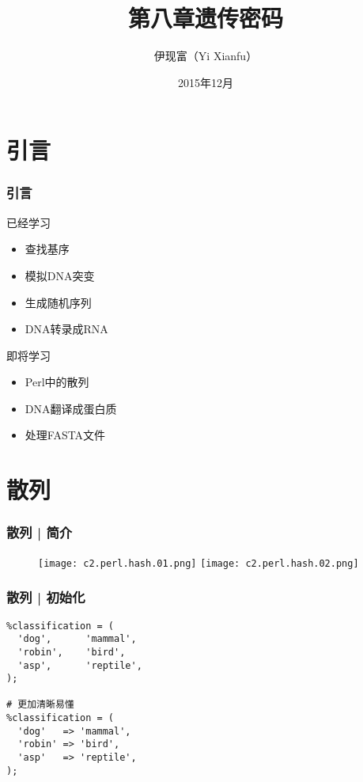 


\title[遗传密码]{第八章\quad 遗传密码}
\author[Yixf]{伊现富（Yi Xianfu）}
\date{2015年12月}



\section{引言}
\begin{frame}
  \frametitle{引言}
  \begin{block}{已经学习}
    \begin{itemize}
      \item 查找基序
      \item 模拟DNA突变
      \item 生成随机序列
      \item DNA转录成RNA
    \end{itemize}
  \end{block}
  \pause
  \begin{block}{即将学习}
    \begin{itemize}
      \item Perl中的散列
      \item DNA翻译成蛋白质
      \item 处理FASTA文件
    \end{itemize}
  \end{block}
\end{frame}

\section{散列}
\begin{frame}
  \frametitle{散列 | 简介}
  \begin{figure}
  \centering
  \texttt{[image: c2.perl.hash.01.png]}\qquad
  \texttt{[image: c2.perl.hash.02.png]}
  \end{figure}
\end{frame}

\begin{frame}[fragile]
  \frametitle{散列 | \alert{初始化}}
\begin{lstlisting}
%classification = (
  'dog',      'mammal',
  'robin',    'bird',
  'asp',      'reptile',
);

# 更加清晰易懂
%classification = (
  'dog'   => 'mammal',
  'robin' => 'bird',
  'asp'   => 'reptile',
);
\end{lstlisting}
\end{frame}

